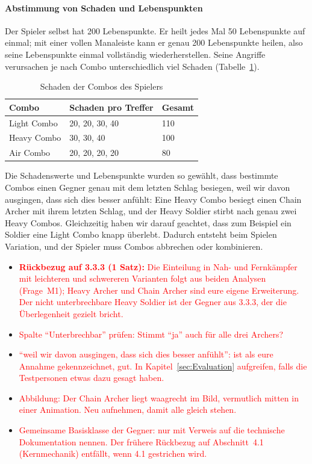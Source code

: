 \documentclass[../Main.tex]{subfiles}
\begin{document}
\paragraph{Abstimmung von Schaden und Lebenspunkten}
Der Spieler selbst hat 200 Lebenspunkte. Er heilt jedes Mal 50 Lebenspunkte auf einmal; mit einer vollen Manaleiste kann er genau 200 Lebenspunkte heilen, also seine Lebenspunkte einmal vollständig wiederherstellen. Seine Angriffe verursachen je nach Combo unterschiedlich viel Schaden (Tabelle~\ref{tab:Combos}).

\begin{table}[H]
    \centering
    \small
    \renewcommand{\arraystretch}{1.3}
    \begin{tabular}{|l|l|l|}
        \hline
        \textbf{Combo} & \textbf{Schaden pro Treffer} & \textbf{Gesamt} \\
        \hline
        Light Combo & 20, 20, 30, 40 & 110 \\
        \hline
        Heavy Combo & 30, 30, 40 & 100 \\
        \hline
        Air Combo & 20, 20, 20, 20 & 80 \\
        \hline
    \end{tabular}
    \caption{Schaden der Combos des Spielers}
    \label{tab:Combos}
\end{table}

Die Schadenswerte und Lebenspunkte wurden so gewählt, dass bestimmte Combos einen Gegner genau mit dem letzten Schlag besiegen, weil wir davon ausgingen, dass sich dies besser anfühlt: Eine Heavy Combo besiegt einen Chain Archer mit ihrem letzten Schlag, und der Heavy Soldier stirbt nach genau zwei Heavy Combos. Gleichzeitig haben wir darauf geachtet, dass zum Beispiel ein Soldier eine Light Combo knapp überlebt. Dadurch entsteht beim Spielen Variation, und der Spieler muss Combos abbrechen oder kombinieren.

\begin{itemize}[leftmargin=1.5cm]
    \item \textcolor{red}{\textbf{Rückbezug auf 3.3.3 (1 Satz):} Die Einteilung in Nah- und Fernkämpfer mit leichteren und schwereren Varianten folgt aus beiden Analysen (Frage~M1); Heavy Archer und Chain Archer sind eure eigene Erweiterung. Der nicht unterbrechbare Heavy Soldier ist der Gegner aus 3.3.3, der die Überlegenheit gezielt bricht.}
    \item \textcolor{red}{Spalte \enquote{Unterbrechbar} prüfen: Stimmt \enquote{ja} auch für alle drei Archers?}
    \item \textcolor{red}{\enquote{weil wir davon ausgingen, dass sich dies besser anfühlt}: ist als eure Annahme gekennzeichnet, gut. In Kapitel~\ref{sec:Evaluation} aufgreifen, falls die Testpersonen etwas dazu gesagt haben.}
    \item \textcolor{red}{Abbildung: Der Chain Archer liegt waagrecht im Bild, vermutlich mitten in einer Animation. Neu aufnehmen, damit alle gleich stehen.}
    \item \textcolor{red}{Gemeinsame Basisklasse der Gegner: nur mit Verweis auf die technische Dokumentation nennen. Der frühere Rückbezug auf Abschnitt~4.1 (Kernmechanik) entfällt, wenn 4.1 gestrichen wird.}
\end{itemize}
\end{document}
